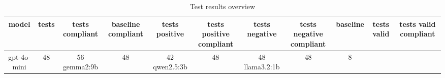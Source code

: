
  \begin{table}[h!]
  \centering
  \begin{tabular}{|c|c|c|c|c|c|c|c|c|c|c|}
  \hline
  model & tests & tests compliant & baseline compliant & tests positive & tests positive compliant & tests negative & tests negative compliant & baseline & tests valid & tests valid compliant \\
  \hline
  gpt-4o-mini & 48 & 56%
\hline
gemma2:9b & 48 & 42%
\hline
qwen2.5:3b & 48 & 48%
\hline
llama3.2:1b & 48 & 8%
  \end{tabular}
  \caption{Test results overview}
  
  \end{table}
  